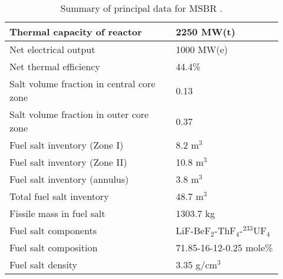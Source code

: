 \begin{table}[h!]
        \caption{Summary of principal data for MSBR \cite{robertson_conceptual_1971}.}
        \begin{tabular}{|m{0.56\linewidth} | m{0.36\linewidth}|}
        \hline
                Thermal capacity of reactor           & 2250 MW(t)
                \\ [5pt] \hline 
                Net electrical output                 & 1000 MW(e) 
                \\ [5pt] \hline 
                Net thermal efficiency        & 44.4\%
                \\ [5pt] \hline 
                Salt volume fraction in central core zone     & 0.13
                \\ [5pt] \hline 
                Salt volume fraction in outer core zone       & 0.37
                \\ [5pt] \hline 
                Fuel salt inventory (Zone I)                  & 8.2 m$^3$	
                \\ [5pt] \hline 
                Fuel salt inventory (Zone II)                 & 10.8 m$^3$	
                \\ [5pt] \hline 
                Fuel salt inventory (annulus)                 & 3.8 m$^3$	
                \\ [5pt] \hline 
                Total fuel salt inventory                     & 48.7 m$^3$	
                \\ [5pt] \hline 
                Fissile mass in fuel salt                   & 1303.7 kg	
                \\ [5pt] \hline 
                Fuel salt components                  & 
                LiF-BeF$_2$-ThF$_4$-$^{233}$UF$_4$	
                \\ [5pt] \hline 
                Fuel salt composition                 & 
                71.85-16-12-0.25 mole\%
                \\[5pt]  \hline 
                Fuel salt density                    & 
                3.35 g/cm$^3$
                \\[5pt]  \hline 
        \end{tabular}
        \label{tab:msbr_tab}
\end{table}

